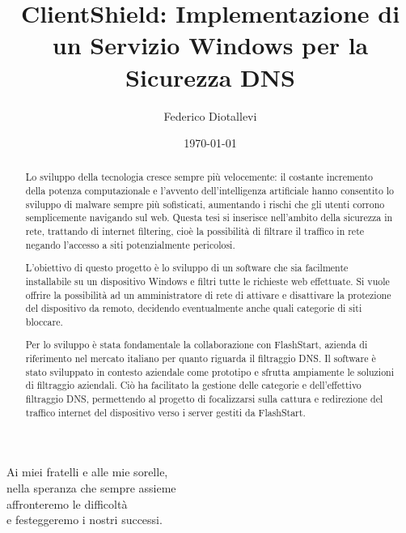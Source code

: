 \documentclass[12pt,a4paper,openright,twoside]{book}
\title{ClientShield: Implementazione di un Servizio Windows per la Sicurezza DNS}
\author{Federico Diotallevi}
\date{\today}
\begin{document}
\frontmatter
\frontispiece

\renewcommand{\abstractname}{Sommario}
\begin{abstract}

Lo sviluppo della tecnologia cresce sempre più velocemente: il costante incremento della potenza computazionale e l'avvento dell'intelligenza artificiale hanno consentito lo sviluppo di malware sempre più sofisticati, aumentando i rischi che gli utenti corrono semplicemente navigando sul web.
Questa tesi si inserisce nell'ambito della sicurezza in rete, trattando di internet filtering, cioè la possibilità di filtrare il traffico in rete negando l'accesso a siti potenzialmente pericolosi.

L'obiettivo di questo progetto è lo sviluppo di un software che sia facilmente installabile su un dispositivo Windows e filtri tutte le richieste web effettuate.
Si vuole offrire la possibilità ad un amministratore di rete di attivare e disattivare la protezione del dispositivo da remoto, decidendo eventualmente anche quali categorie di siti bloccare.

Per lo sviluppo è stata fondamentale la collaborazione con FlashStart, azienda di riferimento nel mercato italiano per quanto riguarda il filtraggio DNS.
Il software è stato sviluppato in contesto aziendale come prototipo e sfrutta ampiamente le soluzioni di filtraggio aziendali.
Ciò ha facilitato la gestione delle categorie e dell'effettivo filtraggio DNS, permettendo al progetto di focalizzarsi sulla cattura e redirezione del traffico internet del dispositivo verso i server gestiti da FlashStart.
\end{abstract}

\begin{dedication}
Ai miei fratelli e alle mie sorelle,\\
nella speranza che sempre assieme\\
affronteremo le difficoltà\\
e festeggeremo i nostri successi.
\end{dedication}

\tableofcontents   

\end{document}
